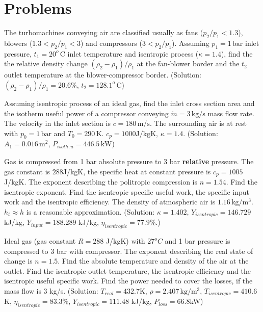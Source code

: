 \section{Problems}

\vspace{1cm}

The turbomachines conveying air are classified usually as fans ($p_2/p_1<1.3$), blowers ($1.3<p_2/p_1<3$) and compressors ($3<p_2/p_1$). Assuming $p_1=1\,\mathrm{bar}$ inlet pressure, $t_1=20^o\,\mathrm{C}$ inlet temperature and isentropic process ($\kappa=1.4$), find the the relative density change $(\rho_2-\rho_1)/\rho_1$ at the fan-blower border and the $t_2$ outlet temperature at the blower-compressor border. (Solution: $(\rho_2-\rho_1)/\rho_1=20.6\%$, $t_2=128.1^o\,\mathrm{C}$)

\vspace{1cm}

Assuming isentropic process of an ideal gas, find the inlet cross section area and the isotherm useful power of a compressor conveying $\dot m = 3\,\mathrm{kg/s}$ mass flow rate. The velocity in the inlet section is $c=180\,\mathrm{m/s}$. The surrounding air is at rest with $p_0=1\,\mathrm{bar}$ and $T_0=290\,\mathrm{K}$. $c_p=1000 \mathrm{J/kgK}$, $\kappa=1.4$. (Solution: $A_1=0.016\,\mathrm{m^2}$, $P_{isoth,u}=446.5\,\mathrm{kW}$)

\vspace{1cm}

Gas is compressed from 1 bar absolute pressure to 3 bar \textbf{relative} pressure. The gas constant is $288$J/kgK, the specific heat at constant pressure is $c_p = 1005$J/kgK. The exponent describing the politropic compression is  $n = 1.54$. Find the isentropic exponent. Find the isentropic specific useful work, the specific input work and the isentropic efficiency. The density of atmospheric air is $1.16\, \mathrm{kg/m^3}$. $h_t\approx h$ is a reasonable approximation. (Solution: $\kappa=1.402$, $Y_{isentropic}=146.729$ kJ/kg, $Y_{input}=188.289$ kJ/kg, $\eta_{isentropic}=77.9$\%.)

\vspace{1cm}

Ideal gas (gas constant $R=288$ J/kgK) with $27^oC$ and 1 bar pressure is compressed to 3 bar with compressor. The exponent describing the real state of change is $n = 1.5$. Find the absolute temperature and density of the air at the outlet. Find the isentropic outlet temperature, the isentropic efficiency and the isentropic useful specific work. Find the power needed to cover the losses, if the mass flow is 3 kg/s. (Solution: $T_{real}=432.7$K, $\rho=2.407\,\mathrm{kg/m^3}$, $T_{isentropic}=410.6$K, $\eta_{isentropic}=83.3$\%,  $Y_{isentropic}=111.48$ kJ/kg, $P_{loss}=66.8$kW)

